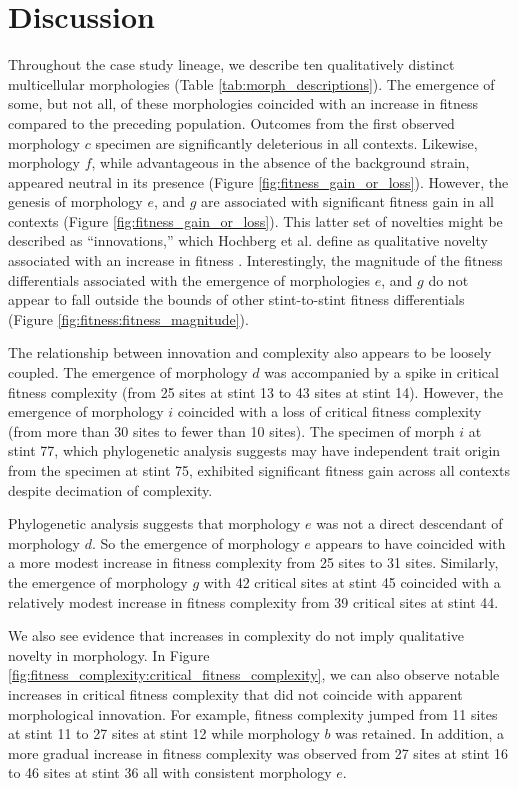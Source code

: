 \section{Discussion}

Throughout the case study lineage, we describe ten qualitatively distinct multicellular morphologies (Table \ref{tab:morph_descriptions}).
The emergence of some, but not all, of these morphologies coincided with an increase in fitness compared to the preceding population.
Outcomes from the first observed morphology $c$ specimen are significantly deleterious in all contexts.
Likewise, morphology $f$, while advantageous in the absence of the background strain, appeared neutral in its presence (Figure \ref{fig:fitness_gain_or_loss}).
However, the genesis of morphology $e$, and $g$ are associated with significant fitness gain in all contexts (Figure \ref{fig:fitness_gain_or_loss}).
This latter set of novelties might be described as ``innovations,'' which Hochberg et al. define as qualitative novelty associated with an increase in fitness \citep{hochberg2017innovation}.
Interestingly, the magnitude of the fitness differentials associated with the emergence of morphologies $e$, and $g$ do not appear to fall outside the bounds of other stint-to-stint fitness differentials (Figure \ref{fig:fitness:fitness_magnitude}).

The relationship between innovation and complexity also appears to be loosely coupled.
The emergence of morphology $d$ was accompanied by a spike in critical fitness complexity (from 25 sites at stint 13 to 43 sites at stint 14).
However, the emergence of morphology $i$ coincided with a loss of critical fitness complexity (from more than 30 sites to fewer than 10 sites).
The specimen of morph $i$ at stint 77, which phylogenetic analysis suggests may have independent trait origin from the specimen at stint 75, exhibited significant fitness gain across all contexts despite decimation of complexity.

Phylogenetic analysis suggests that morphology $e$ was not a direct descendant of morphology $d$.
So the emergence of morphology $e$ appears to have coincided with a more modest increase in fitness complexity from 25 sites to 31 sites.
Similarly, the emergence of morphology $g$ with 42 critical sites at stint 45 coincided with a relatively modest increase in fitness complexity from 39 critical sites at stint 44.

We also see evidence that increases in complexity do not imply qualitative novelty in morphology.
In Figure \ref{fig:fitness_complexity:critical_fitness_complexity}, we can also observe notable increases in critical fitness complexity that did not coincide with apparent morphological innovation.
For example, fitness complexity jumped from 11 sites at stint 11 to 27 sites at stint 12 while morphology $b$ was retained.
In addition, a more gradual increase in fitness complexity was observed from 27 sites at stint 16 to 46 sites at stint 36 all with consistent morphology $e$.

